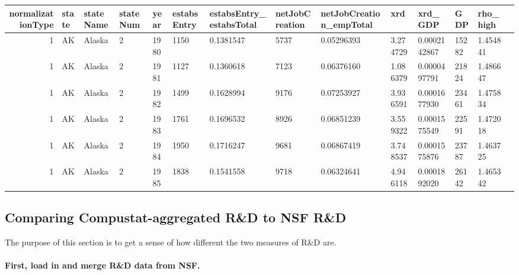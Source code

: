 \documentclass[11pt]{article}
\begin{document}
    \begin{tabular}{r|lllllllllllll}
 normalizationType & state & stateName & stateNum & year & estabsEntry & estabsEntry\_estabsTotal & netJobCreation & netJobCreation\_empTotal & xrd & xrd\_GDP & GDP & rho\_high\\
\hline
	 1            & AK           & Alaska       & 2            & 1980         & 1150         & 0.1381547    & 5737         & 0.05296393   & 3.274729     & 0.0002142867 & 15282        & 1.454841    \\
	 1            & AK           & Alaska       & 2            & 1981         & 1127         & 0.1360618    & 7123         & 0.06376160   & 1.086379     & 0.0000497791 & 21824        & 1.486647    \\
	 1            & AK           & Alaska       & 2            & 1982         & 1499         & 0.1628994    & 9176         & 0.07253927   & 3.936591     & 0.0001677930 & 23461        & 1.475834    \\
	 1            & AK           & Alaska       & 2            & 1983         & 1761         & 0.1696532    & 8926         & 0.06851239   & 3.559322     & 0.0001575549 & 22591        & 1.472018    \\
	 1            & AK           & Alaska       & 2            & 1984         & 1950         & 0.1716247    & 9681         & 0.06867419   & 3.748537     & 0.0001575876 & 23787        & 1.463725    \\
	 1            & AK           & Alaska       & 2            & 1985         & 1838         & 0.1541558    & 9718         & 0.06324641   & 4.946118     & 0.0001892020 & 26142        & 1.465342    \\
\end{tabular}


    
    \hypertarget{comparing-compustat-aggregated-rd-to-nsf-rd}{%
\subsection{Comparing Compustat-aggregated R\&D to NSF
R\&D}\label{comparing-compustat-aggregated-rd-to-nsf-rd}}

    The purpose of this section is to get a sense of how different the two
measures of R\&D are.

\hypertarget{first-load-in-and-merge-rd-data-from-nsf.}{%
\paragraph{First, load in and merge R\&D data from
NSF.}\label{first-load-in-and-merge-rd-data-from-nsf.}}
\end{document}
